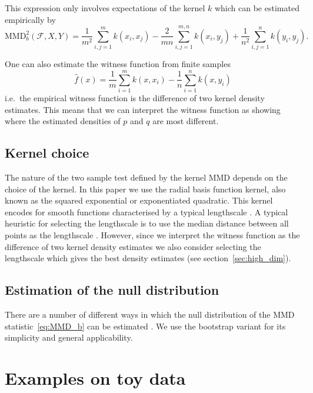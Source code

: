 \documentclass{article} %
\def\ie{i.e.\ }
\begin{document}
This expression only involves expectations of the kernel $k$ which can be estimated empirically by
\begin{equation}
  \textrm{MMD}_b^2(\mathcal{F},X,Y) = \frac{1}{m^2}\sum_{i,j=1}^{m}k(x_i,x_j) - \frac{2}{mn}\sum_{i,j=1}^{m,n}k(x_i,y_j) + \frac{1}{n^2}\sum_{i,j=1}^{n}k(y_i,y_j).
\label{eq:MMD_b}
\end{equation}

One can also estimate the witness function from finite samples
\begin{equation}
\hat{f}(x) = \frac{1}{m}\sum_{i=1}^{m}k(x,x_i) - \frac{1}{n}\sum_{i=1}^{n}k(x,y_i)
\label{eq:witness-estimate}
\end{equation}
\ie the empirical witness function is the difference of two kernel density estimates.
This means that we can interpret the witness function as showing where the estimated densities of $p$ and $q$ are most different.

\subsection{Kernel choice}

The nature of the two sample test defined by the kernel MMD depends on the choice of the kernel.
In this paper we use the radial basis function kernel, also known as the squared exponential or exponentiated quadratic.
This kernel encodes for smooth functions characterised by a typical lengthscale \citep[e.g.][]{Rasmussen2006-ml}.
A typical heuristic for selecting the lengthscale is to use the median distance between all points as the lengthscale \citep[e.g.][]{Gretton2008-ik}.
However, since we interpret the witness function as the difference of two kernel density estimates we also consider selecting the lengthscale which gives the best density estimates (see section~\ref{sec:high_dim}).

\subsection{Estimation of the null distribution}

There are a number of different ways in which the null distribution of the MMD statistic~\eqref{eq:MMD_b} can be estimated \citep[e.g.][]{Gretton2008-ik}.
We use the bootstrap variant for its simplicity and general applicability.

\section{Examples on toy data}
\end{document}
